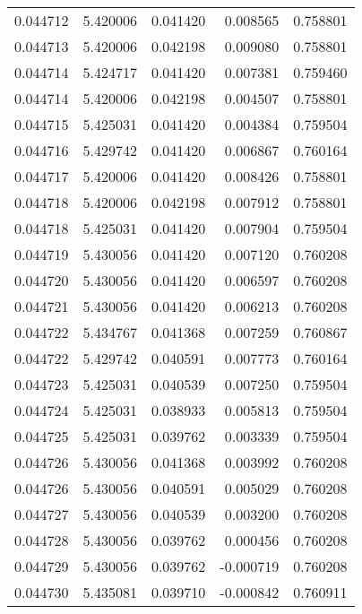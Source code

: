 \begin{tabular}{lrrrr}
0.044712    &  5.420006 &  0.041420 &  0.008565 &             0.758801 \\
0.044713    &  5.420006 &  0.042198 &  0.009080 &             0.758801 \\
0.044714    &  5.424717 &  0.041420 &  0.007381 &             0.759460 \\
0.044714    &  5.420006 &  0.042198 &  0.004507 &             0.758801 \\
0.044715    &  5.425031 &  0.041420 &  0.004384 &             0.759504 \\
0.044716    &  5.429742 &  0.041420 &  0.006867 &             0.760164 \\
0.044717    &  5.420006 &  0.041420 &  0.008426 &             0.758801 \\
0.044718    &  5.420006 &  0.042198 &  0.007912 &             0.758801 \\
0.044718    &  5.425031 &  0.041420 &  0.007904 &             0.759504 \\
0.044719    &  5.430056 &  0.041420 &  0.007120 &             0.760208 \\
0.044720    &  5.430056 &  0.041420 &  0.006597 &             0.760208 \\
0.044721    &  5.430056 &  0.041420 &  0.006213 &             0.760208 \\
0.044722    &  5.434767 &  0.041368 &  0.007259 &             0.760867 \\
0.044722    &  5.429742 &  0.040591 &  0.007773 &             0.760164 \\
0.044723    &  5.425031 &  0.040539 &  0.007250 &             0.759504 \\
0.044724    &  5.425031 &  0.038933 &  0.005813 &             0.759504 \\
0.044725    &  5.425031 &  0.039762 &  0.003339 &             0.759504 \\
0.044726    &  5.430056 &  0.041368 &  0.003992 &             0.760208 \\
0.044726    &  5.430056 &  0.040591 &  0.005029 &             0.760208 \\
0.044727    &  5.430056 &  0.040539 &  0.003200 &             0.760208 \\
0.044728    &  5.430056 &  0.039762 &  0.000456 &             0.760208 \\
0.044729    &  5.430056 &  0.039762 & -0.000719 &             0.760208 \\
0.044730    &  5.435081 &  0.039710 & -0.000842 &             0.760911 \\

\end{tabular}
